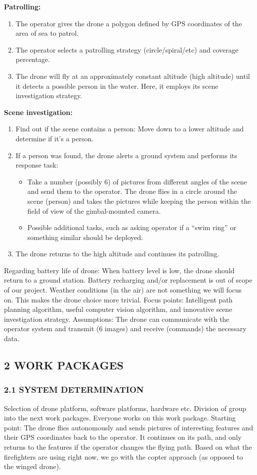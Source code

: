 \textbf{Patrolling:}
\begin{enumerate}
\item The operator gives the drone a polygon defined by GPS coordinates of the area of sea to patrol.
\item The operator selects a patrolling strategy (circle/spiral/etc) and coverage percentage.
\item The drone will fly at an approximately
 constant altitude (high altitude) until it detects
 a possible person in the water.
 Here, it employs its scene investigation strategy.
\end{enumerate} 
\textbf{Scene investigation:}
\begin{enumerate}
\item Find out if the scene contains a person: 
Move down to a lower altitude and determine if it’s a person.
\item If a person was found, the drone alerts a 
ground system and performs its response task:
\begin{itemize}
\item Take a number (possibly 6) of pictures from different
 angles of the scene and send them to the operator. 
The drone flies in a circle around the scene (person)
 and takes the pictures while keeping the person
 within the field of view of the gimbal-mounted camera.
\item Possible additional tasks, such as asking operator
 if a “swim ring” or something similar should be deployed.
\end{itemize}

\item The drone returns to the high altitude and continues its patrolling. \end{enumerate}
Regarding battery life of drone: 
When battery level is low, the drone should return
 to a ground station. Battery recharging and/or 
replacement is out of scope of our project.
Weather conditions (in the air) are not something
 we will focus on. This makes the drone choice more trivial.
Focus points: Intelligent path planning algorithm, useful computer vision algorithm, and innovative scene investigation strategy.
Assumptions: The drone can communicate with the operator system and transmit (6 images) and receive (commands) the necessary data.\\
\subsection*{2 WORK PACKAGES}
\subsubsection*{2.1 SYSTEM DETERMINATION}
Selection of drone platform, software platforms, hardware etc.
Division of group into the next work packages.
Everyone works on this work package.
Starting point: The drone flies autonomously and sends pictures of interesting features and their GPS coordinates back to the operator. It continues on its path, and only returns to the features if the operator changes the flying path.
Based on what the firefighters are using right now, we go with the copter approach (as opposed to the winged drone).\\
